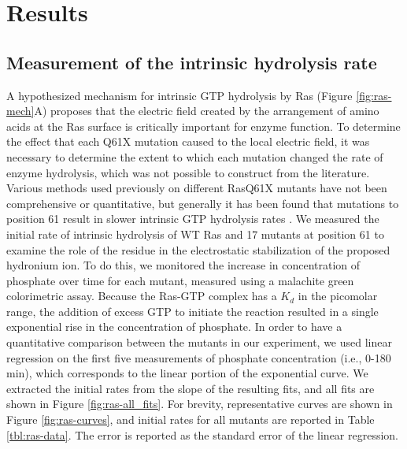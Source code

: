 \section{Results} \label{ras-results}

\subsection{Measurement of the intrinsic hydrolysis rate}

A hypothesized mechanism for intrinsic GTP hydrolysis by Ras (Figure \ref{fig:ras-mech}A) proposes that the electric field created by the arrangement of amino acids at the Ras surface is critically important for enzyme function. 
To determine the effect that each Q61X mutation caused to the local electric field, it was necessary to determine the extent to which each mutation changed the rate of enzyme hydrolysis, which was not possible to construct from the literature. 
Various methods used previously on different RasQ61X mutants have not been comprehensive or quantitative, but generally it has been found that mutations to position 61 result in slower intrinsic GTP hydrolysis rates \cite{Der1986, Krengel1990}. 
We measured the initial rate of intrinsic hydrolysis of WT Ras and 17 mutants at position 61 to examine the role of the residue in the electrostatic stabilization of the proposed hydronium ion. 
To do this, we monitored the increase in concentration of phosphate over time for each mutant, measured using a malachite green colorimetric assay. 
Because the Ras-GTP complex has a $K_d$ in the picomolar range, the addition of excess GTP to initiate the reaction resulted in a single exponential rise in the concentration of phosphate. 
In order to have a quantitative comparison between the mutants in our experiment, we used linear regression on the first five measurements of phosphate concentration (i.e., 0-180 min), which corresponds to the linear portion of the exponential curve. 
We extracted the initial rates from the slope of the resulting fits, and all fits are shown in Figure \ref{fig:ras-all_fits}. 
For brevity, representative curves are shown in Figure \ref{fig:ras-curves}, and initial rates for all mutants are reported in Table \ref{tbl:ras-data}. 
The error is reported as the standard error of the linear regression. 

